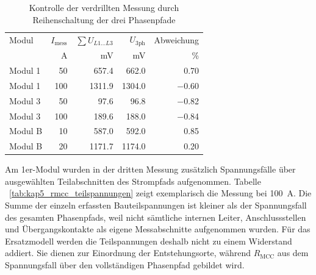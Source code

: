 \begin{table}[H]
    \centering
    \caption{Kontrolle der verdrillten Messung durch Reihenschaltung der
    drei Phasenpfade}
    \label{tab:kap5_rmcc_reihenkontrolle}
    \begin{tabular}{@{}lrrrr@{}}
        \toprule
        Modul & \(I_\mathrm{mess}\) &
        \(\sum U_{L1\ldots L3}\) & \(U_\mathrm{3ph}\) & Abweichung \\
        & \si{\ampere} & \si{\milli\volt} &
        \si{\milli\volt} & \si{\percent} \\
        \midrule
        Modul 1 & \num{50}  & \num{657.4}  & \num{662.0}  & \num{0.70} \\
        Modul 1 & \num{100} & \num{1311.9} & \num{1304.0} & \num{-0.60} \\
        Modul 3 & \num{50}  & \num{97.6}   & \num{96.8}   & \num{-0.82} \\
        Modul 3 & \num{100} & \num{189.6}  & \num{188.0}  & \num{-0.84} \\
        Modul B & \num{10}  & \num{587.0}  & \num{592.0}  & \num{0.85} \\
        Modul B & \num{20}  & \num{1171.7} & \num{1174.0} & \num{0.20} \\
        \bottomrule
    \end{tabular}
\end{table}

Am 1er-Modul wurden in der dritten Messung zusätzlich Spannungsfälle über
ausgewählten Teilabschnitten des Strompfads aufgenommen. Tabelle
~\ref{tab:kap5_rmcc_teilspannungen} zeigt exemplarisch die Messung bei
\SI{100}{\ampere}. Die Summe der einzeln erfassten Bauteilspannungen ist
kleiner als der Spannungsfall des gesamten Phasenpfads, weil nicht sämtliche
internen Leiter, Anschlussstellen und Übergangskontakte als eigene
Messabschnitte aufgenommen wurden. Für das Ersatzmodell werden die
Teilspannungen deshalb nicht zu einem Widerstand addiert. Sie dienen zur
Einordnung der Entstehungsorte, während \(R_\mathrm{MCC}\) aus dem
Spannungsfall über den vollständigen Phasenpfad gebildet wird.

